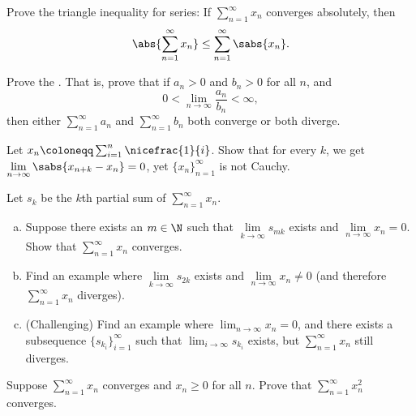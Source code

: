\begin{exercise}
Prove the triangle inequality for series:
If $\sum_{n=1}^\infty x_n$ converges absolutely, then
\begin{equation*}
\abs{\sum_{n=1}^\infty x_n} \leq
\sum_{n=1}^\infty \sabs{x_n} .
\end{equation*}
\end{exercise}

\begin{exercise}
Prove the \emph{}.  That is, prove that if
$a_n > 0$ and $b_n > 0$ for all $n$, and
\begin{equation*}
0 < \lim_{n\to\infty} \frac{a_n}{b_n} < \infty ,
\end{equation*}
then either $\sum_{n=1}^\infty a_n$ and $\sum_{n=1}^\infty b_n$ both converge or both diverge.
\end{exercise}

\begin{exercise} \label{exercise:badnocauchy}
Let $x_n \coloneqq \sum_{i=1}^n \nicefrac{1}{i}$.  Show that for every $k$,
we get
$\displaystyle \lim_{n\to\infty} \sabs{x_{n+k}-x_n} = 0$, yet
$\{ x_n \}_{n=1}^\infty$ is not Cauchy.
\end{exercise}

\begin{samepage}
\begin{exercise}
Let $s_k$ be the $k$th partial sum of $\sum_{n=1}^\infty x_n$.
\begin{enumerate}[a)]
\item
Suppose there exists an $m \in \N$ such that $\lim\limits_{k\to\infty}
s_{mk}$ exists and $\lim\limits_{n\to\infty} x_n = 0$.  Show that
$\sum_{n=1}^\infty x_n$ converges.
\item
Find an example where $\lim\limits_{k\to\infty} s_{2k}$ exists and
$\lim\limits_{n\to\infty} x_n \not= 0$ (and therefore $\sum_{n=1}^\infty x_n$ diverges).
\item
(Challenging) Find an example where $\lim_{n\to\infty} x_n = 0$, and there exists
a subsequence $\{ s_{k_i} \}_{i=1}^\infty$ such that $\displaystyle \lim_{i\to\infty} s_{k_i}$ exists,
but $\sum_{n=1}^\infty x_n$ still diverges.
\end{enumerate}
\end{exercise}
\end{samepage}

\begin{exercise} \label{exercise:squareseriesconv}
Suppose $\sum_{n=1}^\infty x_n$ converges and $x_n \geq 0$ for all $n$.
Prove that $\sum_{n=1}^\infty x_n^2$ converges.
\end{exercise}

